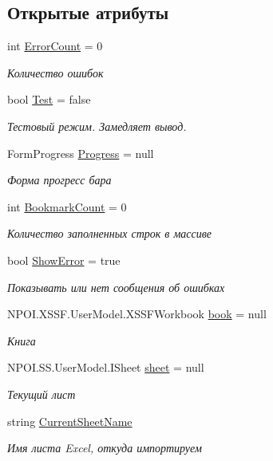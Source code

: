 \subsection*{Открытые атрибуты}
\begin{DoxyCompactItemize}
\item 
int \mbox{\hyperlink{class_f_b_a_1_1_sys_import_af943ea2d6689f2541bbaad184e525c48}{Error\+Count}} = 0
\begin{DoxyCompactList}\small\item\em Количество ошибок \end{DoxyCompactList}\item 
bool \mbox{\hyperlink{class_f_b_a_1_1_sys_import_a5e5ac2b328fcbd766b66a7db7834b5b9}{Test}} = false
\begin{DoxyCompactList}\small\item\em Тестовый режим. Замедляет вывод. \end{DoxyCompactList}\item 
Form\+Progress \mbox{\hyperlink{class_f_b_a_1_1_sys_import_aaa3b004295e0192bcd2e7abbb9ced53b}{Progress}} = null
\begin{DoxyCompactList}\small\item\em Форма прогресс бара \end{DoxyCompactList}\item 
int \mbox{\hyperlink{class_f_b_a_1_1_sys_import_aa5f132f7412957d80ee82093f75b5cd7}{Bookmark\+Count}} = 0
\begin{DoxyCompactList}\small\item\em Количество заполненных строк в массиве \end{DoxyCompactList}\item 
bool \mbox{\hyperlink{class_f_b_a_1_1_sys_import_a0b4d685dafe5ad7443294ff6b1ff2ed7}{Show\+Error}} = true
\begin{DoxyCompactList}\small\item\em Показывать или нет сообщения об ошибках \end{DoxyCompactList}\item 
N\+P\+O\+I.\+X\+S\+S\+F.\+User\+Model.\+X\+S\+S\+F\+Workbook \mbox{\hyperlink{class_f_b_a_1_1_sys_import_a06f2e2b34e5c33a54a65a3512d39e4a7}{book}} = null
\begin{DoxyCompactList}\small\item\em Книга \end{DoxyCompactList}\item 
N\+P\+O\+I.\+S\+S.\+User\+Model.\+I\+Sheet \mbox{\hyperlink{class_f_b_a_1_1_sys_import_ace1ed279d01ad9253158209f464187fa}{sheet}} = null
\begin{DoxyCompactList}\small\item\em Текущий лист \end{DoxyCompactList}\item 
string \mbox{\hyperlink{class_f_b_a_1_1_sys_import_a1da0d538e84d93cdef29339a19509355}{Current\+Sheet\+Name}}
\begin{DoxyCompactList}\small\item\em Имя листа Excel, откуда импортируем \end{DoxyCompactList}\end{DoxyCompactItemize}


